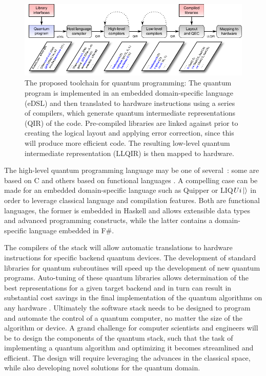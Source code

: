 \documentclass[journal]{IEEEtran}
\begin{document}
\begin{figure}[t]
\centering
\includegraphics[width=\textwidth]{figures/coarse_toolchain}
\caption{The proposed toolchain for quantum programming: The quantum program is implemented in an embedded domain-specific language (eDSL) and then translated to hardware instructions using a series of compilers, which generate quantum intermediate representations (QIR) of the code. Pre-compiled libraries are linked against prior to creating the logical layout and applying error correction, since this will produce more efficient code. The resulting low-level quantum intermediate representation (LLQIR) is then mapped to hardware.}
\label{fig:toolchain}
\end{figure}

The high-level quantum programming language may be one of several~\cite{gay2006quantum}:
some are based on C \cite{omer1998procedural} and others based on functional languages \cite{green13,wecker14}.
A compelling case can be made for an embedded domain-specific language such as Quipper \cite{green13} or LIQ$Ui\ket{} $\cite{wecker14} in order to leverage classical language and compilation features.
Both are functional languages, the former is embedded in Haskell and allows extensible data types and advanced programming constructs,
while the latter contains a domain-specific language embedded in F\#.

The compilers of the stack will allow automatic translations to hardware instructions for specific backend quantum devices.  The development of standard libraries for quantum subroutines will speed up the development of new quantum programs.
Auto-tuning of these quantum libraries allows determination of the best representations for a given target backend and in turn can result in substantial cost savings in the final implementation of the quantum algorithms on any hardware  \cite{stack}.  Ultimately the software stack needs to be designed to program and automate the control of a quantum computer, no matter the size of the algorithm or device.
A grand challenge for computer scientists and engineers will be to design the components of the quantum stack, such that the task of implementing a quantum algorithm and optimizing it becomes streamlined and efficient. The design will require leveraging the advances in the classical space, while also developing novel solutions for the quantum domain.
\end{document}
